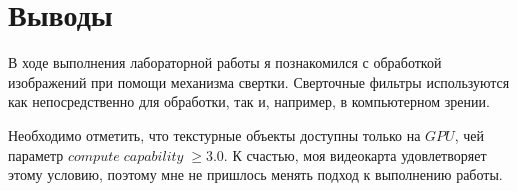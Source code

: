 \section{Выводы}
В ходе выполнения лабораторной работы я познакомился с обработкой изображений при помощи механизма свертки. 
Сверточные фильтры используются как непосредственно для обработки, так и, например, в компьютерном зрении.

Необходимо отметить, что текстурные объекты доступны только на $GPU$, чей параметр $compute\;capability\;\geqslant 3.0 $. 
К  счастью, моя видеокарта удовлетворяет этому условию, поэтому мне не пришлось менять подход к выполнению работы.
\pagebreak
